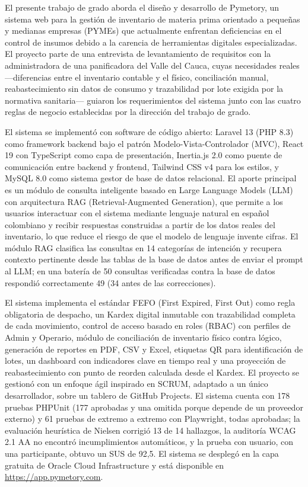 
El presente trabajo de grado aborda el diseño y desarrollo de Pymetory, un sistema web para la gestión de inventario de materia prima orientado a pequeñas y medianas empresas (PYMEs) \cite{bbva2024mipymes,conpes4069} que actualmente enfrentan deficiencias en el control de insumos debido a la carencia de herramientas digitales especializadas. El proyecto parte de una entrevista de levantamiento de requisitos con la administradora de una panificadora del Valle del Cauca, cuyas necesidades reales ---diferencias entre el inventario contable y el físico, conciliación manual, reabastecimiento sin datos de consumo y trazabilidad por lote exigida por la normativa sanitaria--- guiaron los requerimientos del sistema junto con las cuatro reglas de negocio establecidas por la dirección del trabajo de grado.

El sistema se implementó con software de código abierto: Laravel 13 (PHP 8.3) como framework backend bajo el patrón Modelo-Vista-Controlador (MVC), React 19 con TypeScript como capa de presentación, Inertia.js 2.0 como puente de comunicación entre backend y frontend, Tailwind CSS v4 para los estilos, y MySQL 8.0 como sistema gestor de base de datos relacional. El aporte principal es un módulo de consulta inteligente basado en Large Language Models (LLM) con arquitectura RAG (Retrieval-Augmented Generation), que permite a los usuarios interactuar con el sistema mediante lenguaje natural en español colombiano y recibir respuestas construidas a partir de los datos reales del inventario, lo que reduce el riesgo de que el modelo de lenguaje invente cifras. El módulo RAG clasifica las consultas en 14 categorías de intención y recupera contexto pertinente desde las tablas de la base de datos antes de enviar el prompt al LLM; en una batería de 50 consultas verificadas contra la base de datos respondió correctamente 49 (34 antes de las correcciones).

El sistema implementa el estándar FEFO (First Expired, First Out) como regla obligatoria de despacho, un Kardex digital inmutable con trazabilidad completa de cada movimiento, control de acceso basado en roles (RBAC) con perfiles de Admin y Operario, módulo de conciliación de inventario físico contra lógico, generación de reportes en PDF, CSV y Excel, etiquetas QR para identificación de lotes, un dashboard con indicadores clave en tiempo real y una proyección de reabastecimiento con punto de reorden calculada desde el Kardex. El proyecto se gestionó con un enfoque ágil inspirado en SCRUM, adaptado a un único desarrollador, sobre un tablero de GitHub Projects. El sistema cuenta con 178 pruebas PHPUnit (177 aprobadas y una omitida porque depende de un proveedor externo) y 61 pruebas de extremo a extremo con Playwright, todas aprobadas; la evaluación heurística de Nielsen corrigió 13 de 14 hallazgos, la auditoría WCAG 2.1 AA no encontró incumplimientos automáticos, y la prueba con usuario, con una participante, obtuvo un SUS de 92,5. El sistema se desplegó en la capa gratuita de Oracle Cloud Infrastructure y está disponible en \url{https://app.pymetory.com}.

